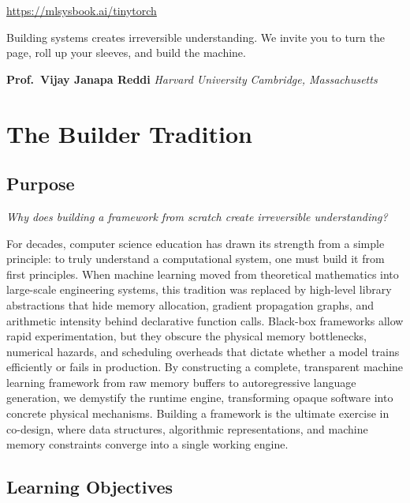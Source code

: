 \documentclass[
  letterpaper,
]{scrbook}
\begin{document}
\url{https://mlsysbook.ai/tinytorch}

Building systems creates irreversible understanding. We invite you to
turn the page, roll up your sleeves, and build the machine.

\vspace{1.5em}

\noindent \textbf{Prof.~Vijay Janapa Reddi} \emph{Harvard University}
\emph{Cambridge, Massachusetts}


\chapter*{The Builder Tradition}\label{the-builder-tradition}


\section*{Purpose}\label{purpose}


\emph{Why does building a framework from scratch create irreversible
understanding?}

For decades, computer science education has drawn its strength from a
simple principle: to truly understand a computational system, one must
build it from first principles. When machine learning moved from
theoretical mathematics into large-scale engineering systems, this
tradition was replaced by high-level library abstractions that hide
memory allocation, gradient propagation graphs, and arithmetic intensity
behind declarative function calls. Black-box frameworks allow rapid
experimentation, but they obscure the physical memory bottlenecks,
numerical hazards, and scheduling overheads that dictate whether a model
trains efficiently or fails in production. By constructing a complete,
transparent machine learning framework from raw memory buffers to
autoregressive language generation, we demystify the runtime engine,
transforming opaque software into concrete physical mechanisms. Building
a framework is the ultimate exercise in co-design, where data
structures, algorithmic representations, and machine memory constraints
converge into a single working engine.

\section*{Learning Objectives}\label{learning-objectives}
\end{document}
